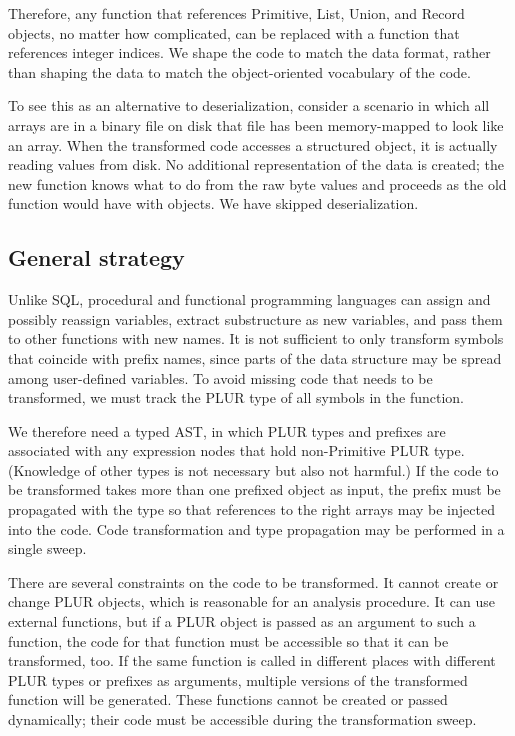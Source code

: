 \documentclass[10pt, conference, compsocconf]{IEEEtran}
\begin{document}
Therefore, any function that references Primitive, List, Union, and Record objects, no matter how complicated, can be replaced with a function that references integer indices. We shape the code to match the data format, rather than shaping the data to match the object-oriented vocabulary of the code.

To see this as an alternative to deserialization, consider a scenario in which all arrays are in a binary file on disk that file has been memory-mapped to look like an array. When the transformed code accesses a structured object, it is actually reading values from disk. No additional representation of the data is created; the new function knows what to do from the raw byte values and proceeds as the old function would have with objects. We have skipped deserialization.

\subsection{General strategy}

Unlike SQL, procedural and functional programming languages can assign and possibly reassign variables, extract substructure as new variables, and pass them to other functions with new names. It is not sufficient to only transform symbols that coincide with prefix names, since parts of the data structure may be spread among user-defined variables. To avoid missing code that needs to be transformed, we must track the PLUR type of all symbols in the function.

We therefore need a typed AST, in which PLUR types and prefixes are associated with any expression nodes that hold non-Primitive PLUR type. (Knowledge of other types is not necessary but also not harmful.) If the code to be transformed takes more than one prefixed object as input, the prefix must be propagated with the type so that references to the right arrays may be injected into the code. Code transformation and type propagation may be performed in a single sweep.

There are several constraints on the code to be transformed. It cannot create or change PLUR objects, which is reasonable for an analysis procedure. It can use external functions, but if a PLUR object is passed as an argument to such a function, the code for that function must be accessible so that it can be transformed, too. If the same function is called in different places with different PLUR types or prefixes as arguments, multiple versions of the transformed function will be generated. These functions cannot be created or passed dynamically; their code must be accessible during the transformation sweep.
\end{document}
